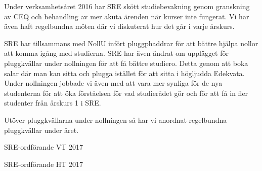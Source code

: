 \documentclass[../_main/handlingar.tex]{subfiles}
\begin{document}
Under verksamhetsåret 2016 har SRE skött studiebevakning genom granskning av CEQ och behandling av mer akuta ärenden när kurser inte fungerat. Vi har även haft regelbundna möten där vi diskuterat hur det går i varje årskurs.

SRE har tillsammans med NollU infört pluggphaddrar för att bättre hjälpa nollor att komma igång med studierna. SRE har även ändrat om upplägget för pluggkvällar under nollningen för att få bättre studiero. Detta genom att boka salar där man kan sitta och plugga istället för att sitta i högljudda Edekvata. Under nollningen jobbade vi även med att vara mer synliga för de nya studenterna för att öka förståelsen för vad studierådet gör och för att få in fler studenter från årskurs 1 i SRE.

Utöver pluggkvällarna under nollningen så har vi anordnat regelbundna pluggkvällar under året.
\begin{signatures}{1}
    \mvh
    \signature{Pontus Landgren}{SRE-ordförande VT 2017}
    \signature{Edvard Carlsson}{SRE-ordförande HT 2017}
\end{signatures}
\end{document}

